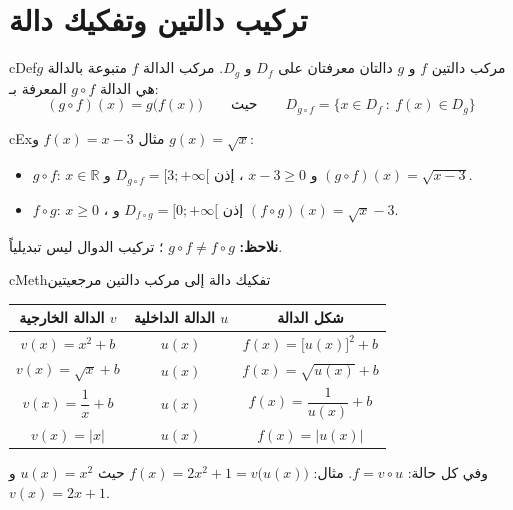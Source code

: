 \documentclass[12pt,a4paper]{article}
\newenvironment{BOX}[2]{\begin{otherlanguage}{english}\begin{arbox}{#1}{#2}}{\end{arbox}\end{otherlanguage}}
\newenvironment{tarif}[1][تعريف]{\begin{BOX}{cDef}{#1}}{\end{BOX}}
\newenvironment{mithal}[1][مثال]{\begin{BOX}{cEx}{#1}}{\end{BOX}}
\newenvironment{tariqa}[1][طريقة]{\begin{BOX}{cMeth}{#1}}{\end{BOX}}
\newcommand{\R}{\mathbb{R}}
\begin{document}
\section{تركيب دالتين وتفكيك دالة}
\begin{tarif}[مركب دالتين]
$f$ و $g$ دالتان معرفتان على $D_f$ و $D_g$. مركب الدالة $f$ متبوعة بالدالة $g$ هي الدالة $g\circ f$ المعرفة بـ:
\[(g\circ f)(x)=g\big(f(x)\big)\qquad\text{حيث}\qquad D_{g\circ f}=\big\{x\in D_f\ :\ f(x)\in D_g\big\}\]
\end{tarif}
\begin{mithal}
$f(x)=x-3$ و $g(x)=\sqrt x$:
\begin{itemize}
\item $g\circ f$: $x\in\R$ و $x-3\ge0$ ، إذن $D_{g\circ f}=[3;+\infty[$ و $(g\circ f)(x)=\sqrt{x-3}$.
\item $f\circ g$: $x\ge0$ ، إذن $D_{f\circ g}=[0;+\infty[$ و $(f\circ g)(x)=\sqrt x-3$.
\end{itemize}
\textbf{نلاحظ:} $g\circ f\neq f\circ g$ ؛ تركيب الدوال ليس تبديلياً.
\end{mithal}
\begin{tariqa}[تفكيك دالة إلى مركب دالتين مرجعيتين]
\begin{center}
\renewcommand{\arraystretch}{1.6}
\begin{tabular}{|C|C|C|}\hline
\textbf{الدالة الخارجية} $v$ & \textbf{الدالة الداخلية} $u$ & \textbf{شكل الدالة}\\\hline
$v(x)=x^2+b$ & $u(x)$ & $f(x)=\big[u(x)\big]^2+b$\\\hline
$v(x)=\sqrt x+b$ & $u(x)$ & $f(x)=\sqrt{u(x)}+b$\\\hline
$v(x)=\dfrac1x+b$ & $u(x)$ & $f(x)=\dfrac{1}{u(x)}+b$\\\hline
$v(x)=|x|$ & $u(x)$ & $f(x)=\big|u(x)\big|$\\\hline
\end{tabular}
\end{center}
وفي كل حالة: $f=v\circ u$. \quad مثال: $f(x)=2x^2+1=v\big(u(x)\big)$ حيث $u(x)=x^2$ و $v(x)=2x+1$.
\end{tariqa}

\end{document}
